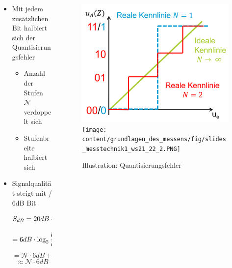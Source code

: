 \begin{frame}
    \frametitle{\insertsection}
    \begin{columns}[c, onlytextwidth]
        \begin{column}{0.5\textwidth}
            \begin{itemize}
                \item Mit jedem zusätzlichen Bit halbiert sich der Quantisierungsfehler
                \begin{itemize}
                    \item Anzahl der Stufen $\mathcal{N}$ verdoppelt sich
                    \item Stufenbreite halbiert sich
                \end{itemize}
                \item Signalqualität steigt mit / 6dB Bit\\
                   \[
                      S_{dB} = 20 dB \cdot \lg{U_{e,eff} \over\displaystyle U_{r,eff}} 
                    \]
                    \[
                        = 6 dB \cdot \log_2{ {U_{e,eff} \over\displaystyle U_{r,eff} }}
                    \]
                    \[
                        =\mathcal{N} \cdot 6dB + 1,76 dB 
                    \]
                    \[
                        \approx \mathcal{N} \cdot 6dB
                    \]
            \end{itemize}
        \end{column}
        \begin{column}{0.5\textwidth}
            \begin{figure}
                \includegraphics[width=0.7\columnwidth]{fig/slides_messtechnik1_ws21_22_1.PNG}
                \texttt{[image: content/grundlagen\_des\_messens/fig/slides\_messtechnik1\_ws21\_22\_2.PNG]}
                \caption{Illustration: Quantisierungsfehler }
            \end{figure}
        \end{column}
    \end{columns}
\end{frame}

